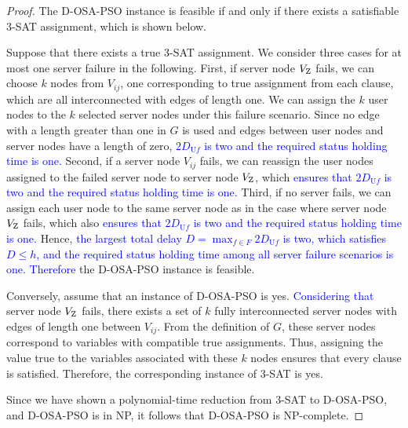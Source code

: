 \documentclass[10pt, letterpaper]{IEEEtran}
\newcommand\blue[1]{\textcolor{blue}{#1}}
\begin{document}
\begin{CJK}{UTF8}{ipxm}
\begin{proof}
  The D-OSA-PSO instance is feasible if and only if there exists a satisfiable 3-SAT assignment, which is shown below.

  Suppose that there exists a true 3-SAT assignment. 
  We consider three cases for at most one server failure in the following.
  First, if server node $V_{\rm Z}$ fails,
  we can choose $k$ nodes from $V_{ij}$, one corresponding to true assignment from each clause, which are all interconnected with edges of length one.
  We can assign the $k$ user nodes to the $k$ selected server nodes under this failure scenario.
  Since no edge with a length greater than one in $G$ is used and edges between user nodes and server nodes have a length of zero, \blue{$2D_{\mathrm{U}f}$ is two and the required status holding time is one.}
  Second, if a server node $V_{ij}$ fails,
  we can reassign the user nodes assigned to the failed server node to server node $V_{\rm Z}$, which \blue{ensures that $2D_{\mathrm{U}f}$ is two and the required status holding time is one.}
  Third, if no server fails, 
  we can assign each user node to the same server node as in the case where server node $V_{\rm Z}$ fails, which also \blue{ensures that $2D_{\mathrm{U}f}$ is two and the required status holding time is one.}
  Hence, \blue{the largest total delay $D = \max_{f \in F}{2D_{\mathrm{U}f}}$ is two, which satisfies $D \leq h$, and the required status holding time among all server failure scenarios is one.
  Therefore} the D-OSA-PSO instance is feasible.

  Conversely, assume that an instance of D-OSA-PSO is yes.
  \blue{Considering that} server node $V_{\rm Z}$ fails, there exists a set of $k$ fully interconnected server nodes with edges of length one between $V_{ij}$.
  From the definition of $G$, these server nodes correspond to variables with compatible true assignments.
  Thus, assigning the value true to the variables associated with these $k$ nodes ensures that every clause is satisfied.
  Therefore, the corresponding instance of 3-SAT is yes.

  Since we have shown a polynomial-time reduction from 3-SAT to D-OSA-PSO, and D-OSA-PSO is in NP, it follows that D-OSA-PSO is NP-complete.
\end{proof}


\end{CJK}
\end{document}
